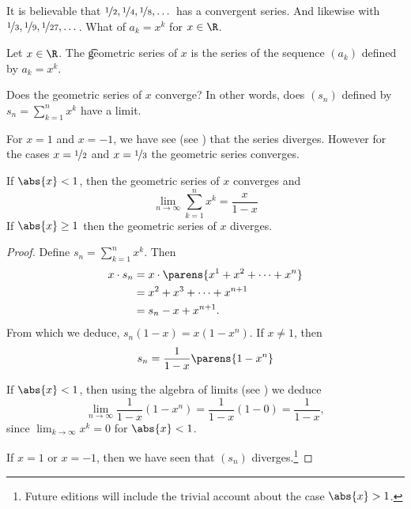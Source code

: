 

It is believable that $\nicefrac{1}{2}, \nicefrac{1}{4}, \nicefrac{1}{8}, \dots$ has a convergent series.
And likewise with $\nicefrac{1}{3}, \nicefrac{1}{9}, \nicefrac{1}{27}, \dots$.
What of $a_k = x^k$ for $x \in \R$.


Let $x \in \R$.
The \t{geometric series} of $x$ is the series of the sequence $(a_k)$ defined by $a_k = x^k$.


Does the geometric series of $x$ converge?
In other words, does $(s_n)$ defined by $s_n = \sum_{k = 1}^{n} x^k$ have a limit.

For $x = 1$ and $x = -1$, we have see (see  ) that the series diverges.
However for the cases $x = \nicefrac{1}{2}$ and $x=\nicefrac{1}{3}$ the geometric series converges.

\begin{proposition}
	If $\abs{x} < 1$, then the geometric series of $x$ converges and
	\[
		\lim_{n \to \infty} \sum_{k = 1}^{n} x^k = \frac{x}{1-x}
	\]
	If $\abs{x} \geq 1$ then the geometric series of $x$ diverges.
	\begin{proof}
		Define $s_n = \sum_{k = 1}^{n} x^k$. Then
		\[
		\begin{aligned}
			x \cdot s_n &= x\cdot\parens{x^1 + x^2 + \cdots + x^n}  \\
				&= x^2 + x^3 + \cdots + x^{n+1} \\
				&= s_n - x + x^{n+1}.
		\end{aligned}
		\]
		From which we deduce, $s_n(1-x) = x(1-x^n)$. If $x \neq 1$, then
		\[
			s_n = \frac{1}{1-x}\parens{1 - x^n}
		\]

		If $\abs{x} < 1$, then using the algebra of limits (see ) we deduce
		\[
			\lim_{n \to \infty} \frac{1}{1-x} (1 - x^n) = \frac{1}{1 - x} (1 - 0) = \frac{1}{1 - x},
		\]
		since $\lim_{k \to \infty} x^k = 0$ for $\abs{x} < 1$.

    If $x = 1$ or $x = -1$, then we have seen that $(s_n)$ diverges.\footnote{Future editions will include the trivial account about the case $\abs{x} > 1$.}


	\end{proof}
\end{proposition}
